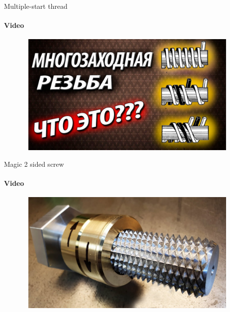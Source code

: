 \documentclass[aspectratio=169]{beamer}
\begin{document}
\begin{frame}[t]{Multiple-start thread}
    \framesubtitle{Video}
    \vspace{-0.6cm}
    \begin{figure}[H]
        \href{https://youtu.be/MwIBrNMjMrw}{
            \centering\includegraphics[height=6cm,width=1\textwidth,keepaspectratio]{multitheding_video.jpg}}
        \label{fig:multitheding_video.jpg}
    \end{figure}
\end{frame}

\begin{frame}[t]{Magic 2 sided screw}
    \framesubtitle{Video}
    \vspace{-0.6cm}
    \begin{figure}[H]
        \href{https://youtu.be/cDfMI5ahbJI?t=722}{
            \centering\includegraphics[height=6cm,width=1\textwidth,keepaspectratio]{two_sided_screw_video.jpg}}
        \label{fig:two_sided_screw_video.jpg}
    \end{figure}
\end{frame}
\end{document}
